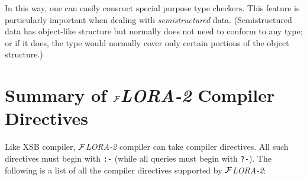 \documentclass[11pt]{article}
\newcommand{\FLORA}{{\mbox{${\cal F}${\small\it LORA}\rm\emph{-2}}}\xspace}
\begin{document}
In this way, one can easily consruct special purpose type checkers.  This
feature is particularly important when dealing with \emph{semistructured}
data. (Semistructured data has object-like structure but normally does not
need to conform to any type; or if it does, the type would normally cover
only certain portions of the object structure.)


\section{Summary of \FLORA Compiler Directives} \label{sec-comp-directives}

%
%
Like XSB compiler, \FLORA compiler can take compiler directives. All
such directives must begin with {\tt :-} (while all queries must begin with
{\tt ?-}). The following is a list of all the compiler directives supported
by \FLORA:
\end{document}
